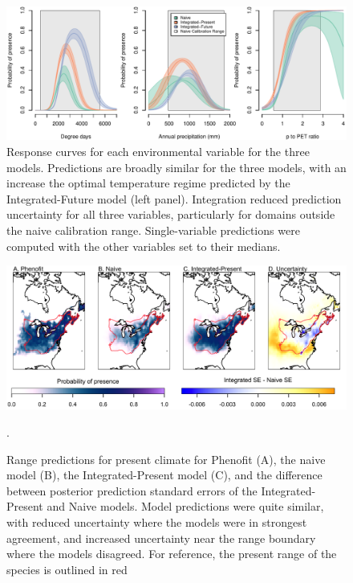 \documentclass[11pt]{article}
\begin{document}
\begin{figure}[t]
	\includegraphics[width=6.5in]{figs/ex2_response.pdf}
	\caption{Response curves for each environmental variable for the three models.
	Predictions are broadly similar for the three models, with an increase the optimal temperature regime predicted by the Integrated-Future model (left panel).
	Integration reduced prediction uncertainty for all three variables, particularly for domains outside the naive calibration range.
	Single-variable predictions were computed with the other variables set to their medians.}
	\label{fig:ex2_response}
\end{figure}

\begin{figure}[t]
\includegraphics[width=6.5in]{figs/ex2_pres_map.png}
\caption{Range predictions for present climate for Phenofit (A), the naive model (B), the Integrated-Present model (C), and the difference between posterior prediction standard errors of the Integrated-Present and Naive models.
Model predictions were quite similar, with reduced uncertainty where the models were in strongest agreement, and increased uncertainty near the range boundary where the models disagreed.
For reference, the present range of the species is outlined in red \citep{Little1971}}.
\label{fig:ex2_map_pres}
\end{figure}

\end{document}
